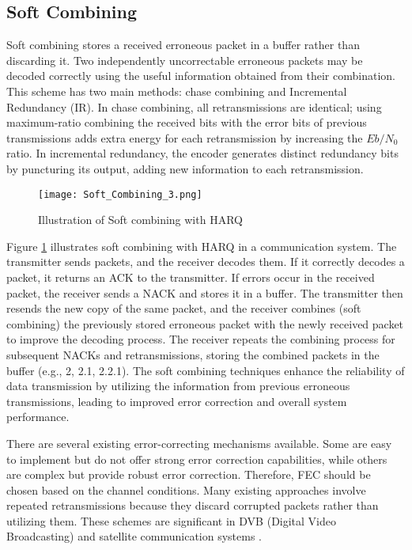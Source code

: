 \documentclass[sn-mathphys-num]{sn-jnl}
\theoremstyle{thmstyleone}
\theoremstyle{thmstyletwo}%
\theoremstyle{thmstylethree}%
\begin{document}
\subsection{Soft Combining \cite{r15}} \label{s1.4}

Soft combining stores a received erroneous packet in a buffer rather than discarding it. Two independently uncorrectable erroneous packets may be decoded correctly using the useful information obtained from their combination. This scheme has two main methods: chase combining and Incremental Redundancy (IR). In chase combining, all retransmissions are identical; using maximum-ratio combining the received bits with the error bits of previous transmissions adds extra energy for each retransmission by increasing the $Eb/N_0$ ratio. In incremental redundancy, the encoder generates distinct redundancy bits by puncturing its output, adding new information to each retransmission.

\begin{figure}[H]
    \centering
    \texttt{[image: Soft\_Combining\_3.png]}
    \caption{Illustration of Soft combining with HARQ }
    \label{fig:10}
\end{figure}

Figure \ref{fig:10} \cite{r23} illustrates soft combining with HARQ in a communication system. The transmitter sends packets, and the receiver decodes them. If it correctly decodes a packet, it returns an ACK to the transmitter. If errors occur in the received packet, the receiver sends a NACK and stores it in a buffer. The transmitter then resends the new copy of the same packet, and the receiver combines (soft combining) the previously stored erroneous packet with the newly received packet to improve the decoding process. The receiver repeats the combining process for subsequent NACKs and retransmissions, storing the combined packets in the buffer (e.g., 2, 2.1, 2.2.1). The soft combining techniques enhance the reliability of data transmission by utilizing the information from previous erroneous transmissions, leading to improved error correction and overall system performance.

There are several existing error-correcting mechanisms available. Some are easy to implement but do not offer strong error correction capabilities, while others are complex but provide robust error correction. Therefore, FEC \cite{r14} should be chosen based on the channel conditions. Many existing approaches involve repeated retransmissions because they discard corrupted packets rather than utilizing them. These schemes are significant in DVB (Digital Video Broadcasting) and satellite communication systems \cite{r18}.
\end{document}
